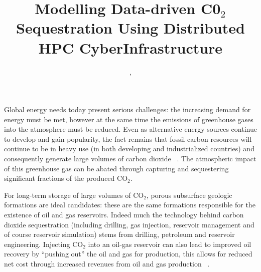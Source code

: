 \documentclass[conference,final]{IEEEtran}
\begin{document}
\title{Modelling Data-driven C0$_{2}$ Sequestration Using Distributed HPC CyberInfrastructure}

 \author{,
    }


\maketitle



Global energy needs today present serious challenges: the increasing demand for energy 
must be met, however at the same time the 
emissions of greenhouse gases into the atmosphere must be reduced. Even as alternative 
energy sources continue to develop and gain 
popularity, the fact remains that fossil carbon resources will continue to be in heavy use 
(in both developing and industrialized 
countries) and consequently generate large volumes of carbon dioxide ~\cite{GeoRPT}. The 
atmospheric impact of this greenhouse gas 
can be abated through capturing and sequestering significant fractions of the produced 
CO$_2$.

For long-term storage of large volumes of CO$_2$, porous subsurface geologic formations 
are ideal candidates: these are the same 
formations responsible for the existence of oil and gas reservoirs. Indeed much the 
technology behind carbon dioxide sequestration 
(including drilling, gas injection, reservoir management and of course reservoir 
simulation) stems from drilling, petroleum and 
reservoir engineering. Injecting CO$_2$ into an oil-gas reservoir can also lead to 
improved oil recovery by ``pushing out'' the 
oil and gas for production, this allows for reduced net cost through increased revenues 
from oil and gas production ~\cite{EORBook}.
\end{document}

